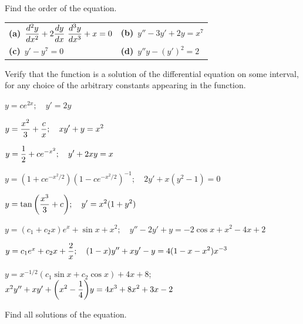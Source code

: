 \exercises
\begin{exerciselist}
  \item\label{exer:1.2.1} Find the order of the equation.

  \begin{tabular}[t]{@{}p{168pt}@{}p{168pt}}
    {\bf (a)}\  $\dst\frac{d^{2}y}{dx^{2}}+2{\frac{dy}{dx}}\ {\frac{d^{3}y}{dx^{3}}}+x=0$ & {\bf (b)}\  $y''-3y'+2y=x^{7}$ \\[9pt]
    {\bf (c)}\  $y'-y^{7}=0$                                                              & {\bf (d)}\  $y''y-(y')^{2}=2$
  \end{tabular}

  \item\label{exer:1.2.2} Verify that the function is a solution of the differential equation on
        some interval, for any choice of the arbitrary constants appearing in the function.

  \begin{alist}
    \item %
    $y=ce^{2x};\quad y'=2y$

    \item %
    $y=\displaystyle\frac{x^{2}}{3}+\frac{c}{x};\quad xy'+y=x^{2}$

    \item %
    $y=\displaystyle\frac{1}{2}+ce^{-x^{2}};\quad y'+2xy=x$

    \item %
    $y=(1+ce^{-x^{2}/2})(1-ce^{-x^{2}/2})^{-1}; \quad 2y'+x(y^{2}-1)=0$

    \item %
    $y=\displaystyle{\tan\left(\frac{x^{3}}{3}+c\right)};\quad y'=x^{2}(1+y^{2})$

    \item %
    $y=(c_{1}+c_{2}x)e^{x}+\sin x+x^{2};\quad y''-2y'+y=-2\cos x+x^{2}-4x+2$

    \item %
    $y=c_{1}e^{x}+c_{2}x+\displaystyle\frac{2}{x};\quad (1-x)y''+xy'-y=4(1-x-x^{2})x^{-3}$

    \item %
    $y=x^{-1/2}(c_{1}\sin x+c_{2}\cos x)+4x+8$;
    \newline
    $x^{2}y''+xy'+\displaystyle{\left(x^{2}-\frac{1}{4}\right)}y=4x^{3}+8x^{2}+3x-2$
  \end{alist}

  \item\label{exer:1.2.3} Find all solutions of the equation.


\end{exerciselist}
